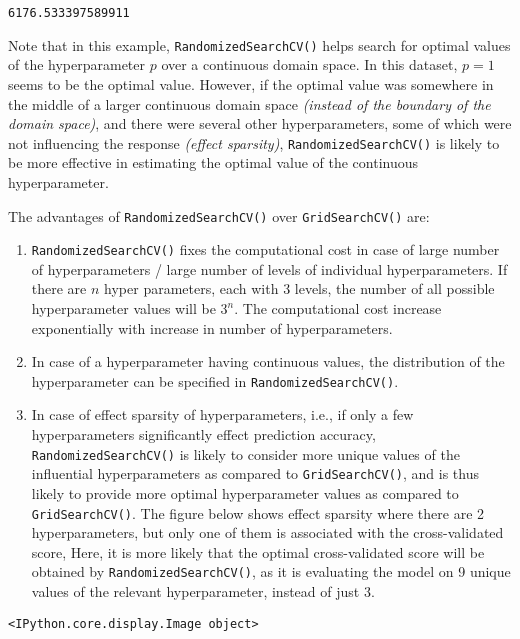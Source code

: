 \documentclass[
  letterpaper,
  DIV=11,
  numbers=noendperiod]{scrreprt}
\begin{document}
\begin{verbatim}
6176.533397589911
\end{verbatim}

Note that in this example, \texttt{RandomizedSearchCV()} helps search
for optimal values of the hyperparameter \(p\) over a continuous domain
space. In this dataset, \(p = 1\) seems to be the optimal value.
However, if the optimal value was somewhere in the middle of a larger
continuous domain space \emph{(instead of the boundary of the domain
space)}, and there were several other hyperparameters, some of which
were not influencing the response \emph{(effect sparsity)},
\texttt{RandomizedSearchCV()} is likely to be more effective in
estimating the optimal value of the continuous hyperparameter.

The advantages of \texttt{RandomizedSearchCV()} over
\texttt{GridSearchCV()} are:

\begin{enumerate}
\def\labelenumi{\arabic{enumi}.}
\item
  \texttt{RandomizedSearchCV()} fixes the computational cost in case of
  large number of hyperparameters / large number of levels of individual
  hyperparameters. If there are \(n\) hyper parameters, each with 3
  levels, the number of all possible hyperparameter values will be
  \(3^n\). The computational cost increase exponentially with increase
  in number of hyperparameters.
\item
  In case of a hyperparameter having continuous values, the distribution
  of the hyperparameter can be specified in
  \texttt{RandomizedSearchCV()}.
\item
  In case of effect sparsity of hyperparameters, i.e., if only a few
  hyperparameters significantly effect prediction accuracy,
  \texttt{RandomizedSearchCV()} is likely to consider more unique values
  of the influential hyperparameters as compared to
  \texttt{GridSearchCV()}, and is thus likely to provide more optimal
  hyperparameter values as compared to \texttt{GridSearchCV()}. The
  figure below shows effect sparsity where there are 2 hyperparameters,
  but only one of them is associated with the cross-validated score,
  Here, it is more likely that the optimal cross-validated score will be
  obtained by \texttt{RandomizedSearchCV()}, as it is evaluating the
  model on 9 unique values of the relevant hyperparameter, instead of
  just 3.
\end{enumerate}

\begin{verbatim}
<IPython.core.display.Image object>
\end{verbatim}
\end{document}
